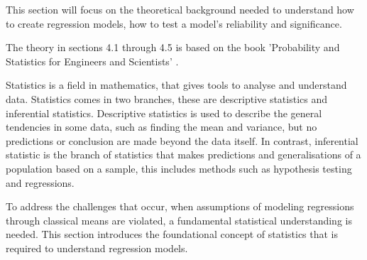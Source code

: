 This section will focus on the theoretical background needed to understand how to create regression models, how to test a model's reliability and significance.

\noindent The theory in sections 4.1 through 4.5 is based on the book 'Probability and Statistics for Engineers and Scientists' \cite{ProbAndStat}. \newline

\noindent Statistics is a field in mathematics, that gives tools to analyse and understand data. Statistics comes in two branches, these are descriptive statistics and inferential statistics. Descriptive statistics is used to describe the general tendencies in some data, such as finding the mean and variance, but no predictions or conclusion are made beyond the data itself. In contrast, inferential statistic is the branch of statistics that makes predictions and generalisations of a population based on a sample, this includes methods such as hypothesis testing and regressions. \newline

\noindent To address the challenges that occur, when  assumptions of modeling regressions through classical means are violated, a fundamental statistical understanding is needed. This section introduces the foundational concept of statistics that is required to understand regression models.






\newpage

